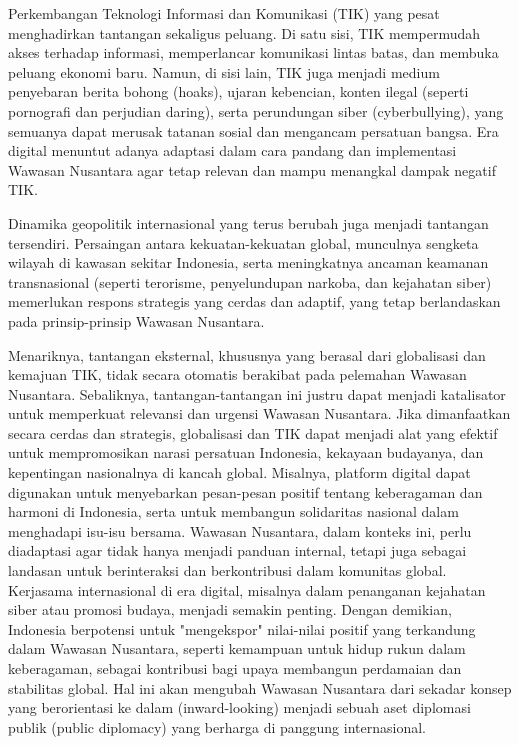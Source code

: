 \documentclass[12pt, a4paper]{article}
\begin{document}
Perkembangan Teknologi Informasi dan Komunikasi (TIK) yang pesat menghadirkan tantangan sekaligus peluang. Di satu sisi, TIK mempermudah akses terhadap informasi, memperlancar komunikasi lintas batas, dan membuka peluang ekonomi baru. Namun, di sisi lain, TIK juga menjadi medium penyebaran berita bohong (hoaks), ujaran kebencian, konten ilegal (seperti pornografi dan perjudian daring), serta perundungan siber (cyberbullying), yang semuanya dapat merusak tatanan sosial dan mengancam persatuan bangsa. Era digital menuntut adanya adaptasi dalam cara pandang dan implementasi Wawasan Nusantara agar tetap relevan dan mampu menangkal dampak negatif TIK.  

Dinamika geopolitik internasional yang terus berubah juga menjadi tantangan tersendiri. Persaingan antara kekuatan-kekuatan global, munculnya sengketa wilayah di kawasan sekitar Indonesia, serta meningkatnya ancaman keamanan transnasional (seperti terorisme, penyelundupan narkoba, dan kejahatan siber) memerlukan respons strategis yang cerdas dan adaptif, yang tetap berlandaskan pada prinsip-prinsip Wawasan Nusantara.  

Menariknya, tantangan eksternal, khususnya yang berasal dari globalisasi dan kemajuan TIK, tidak secara otomatis berakibat pada pelemahan Wawasan Nusantara. Sebaliknya, tantangan-tantangan ini justru dapat menjadi katalisator untuk memperkuat relevansi dan urgensi Wawasan Nusantara. Jika dimanfaatkan secara cerdas dan strategis, globalisasi dan TIK dapat menjadi alat yang efektif untuk mempromosikan narasi persatuan Indonesia, kekayaan budayanya, dan kepentingan nasionalnya di kancah global. Misalnya, platform digital dapat digunakan untuk menyebarkan pesan-pesan positif tentang keberagaman dan harmoni di Indonesia, serta untuk membangun solidaritas nasional dalam menghadapi isu-isu bersama. Wawasan Nusantara, dalam konteks ini, perlu diadaptasi agar tidak hanya menjadi panduan internal, tetapi juga sebagai landasan untuk berinteraksi dan berkontribusi dalam komunitas global. Kerjasama internasional di era digital, misalnya dalam penanganan kejahatan siber atau promosi budaya, menjadi semakin penting. Dengan demikian, Indonesia berpotensi untuk "mengekspor" nilai-nilai positif yang terkandung dalam Wawasan Nusantara, seperti kemampuan untuk hidup rukun dalam keberagaman, sebagai kontribusi bagi upaya membangun perdamaian dan stabilitas global. Hal ini akan mengubah Wawasan Nusantara dari sekadar konsep yang berorientasi ke dalam (inward-looking) menjadi sebuah aset diplomasi publik (public diplomacy) yang berharga di panggung internasional.  
\end{document}
